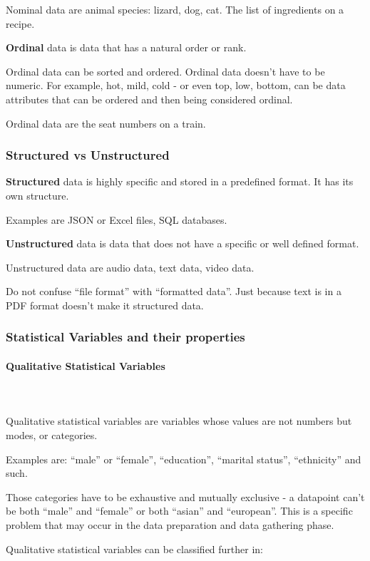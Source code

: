 \documentclass{article}
\begin{document}
Nominal data are animal species: lizard, dog, cat. The list of ingredients on a recipe.

\textbf{Ordinal} data is data that has a natural order or rank. 

Ordinal data can be sorted and ordered. 
Ordinal data doesn’t have to be numeric. For example, hot, mild, cold - or even top, low, bottom, can be data attributes that can be ordered and then being considered ordinal. 

Ordinal data are the seat numbers on a train. 

\subsubsection{Structured vs Unstructured}
\textbf{Structured} data is highly specific and stored in a predefined format. It has its own structure.

Examples are JSON or Excel files, SQL databases. 

\textbf{Unstructured} data is data that does not have a specific or well defined format. 

Unstructured data are audio data, text data, video data. 

Do not confuse “file format” with “formatted data”. 
Just because text is in a PDF format doesn't make it structured data. 

\subsubsection{Statistical Variables and their properties}

\paragraph{Qualitative Statistical Variables}\mbox{} \\
\mbox{} \\

Qualitative statistical variables are variables whose values are not numbers but modes, or categories. 

Examples are: “male” or “female”, “education”, “marital status”, “ethnicity” and such.

Those categories have to be exhaustive and mutually exclusive - a datapoint can’t be both “male” and “female” or both “asian” and “european”. This is a specific problem that may occur in the data preparation and data gathering phase. 

Qualitative statistical variables can be classified further in:
\end{document}
